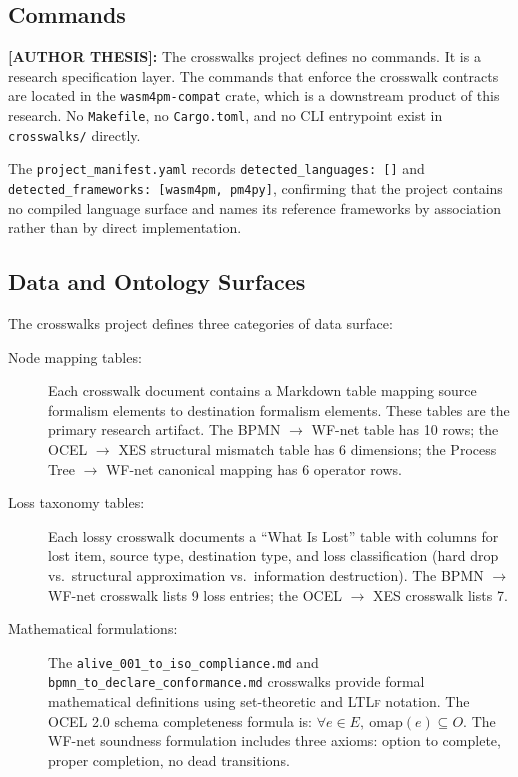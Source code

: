 \subsection{Commands}
\label{sec:crosswalks-impl-commands}

\textbf{[AUTHOR THESIS]:} The crosswalks project defines no commands. It is a research
specification layer. The commands that enforce the crosswalk contracts are located in the
\texttt{wasm4pm-compat} crate, which is a downstream product of this research. No \texttt{Makefile},
no \texttt{Cargo.toml}, and no CLI entrypoint exist in \texttt{crosswalks/} directly.

The \texttt{project\_manifest.yaml} records \texttt{detected\_languages: []} and
\texttt{detected\_frameworks: [wasm4pm, pm4py]}, confirming that the project contains no
compiled language surface and names its reference frameworks by association rather than
by direct implementation.

\subsection{Data and Ontology Surfaces}
\label{sec:crosswalks-impl-data}

The crosswalks project defines three categories of data surface:

\begin{description}
  \item[Node mapping tables:] Each crosswalk document contains a Markdown table mapping source
    formalism elements to destination formalism elements. These tables are the primary research
    artifact. The \textsc{BPMN} $\to$ WF-net table has 10 rows; the \textsc{OCEL} $\to$ \textsc{XES}
    structural mismatch table has 6 dimensions; the Process Tree $\to$ WF-net canonical mapping
    has 6 operator rows.
  \item[Loss taxonomy tables:] Each lossy crosswalk documents a ``What Is Lost'' table with
    columns for lost item, source type, destination type, and loss classification (hard drop
    vs.\ structural approximation vs.\ information destruction). The \textsc{BPMN} $\to$ WF-net
    crosswalk lists 9 loss entries; the \textsc{OCEL} $\to$ \textsc{XES} crosswalk lists 7.
  \item[Mathematical formulations:] The \texttt{alive\_001\_to\_iso\_compliance.md} and
    \texttt{bpmn\_to\_declare\_conformance.md} crosswalks provide formal mathematical
    definitions using set-theoretic and \textsc{LTLf} notation. The \textsc{OCEL} 2.0 schema
    completeness formula is: $\forall e \in E,\ \text{omap}(e) \subseteq O$. The WF-net
    soundness formulation includes three axioms: option to complete, proper completion, no dead
    transitions.
\end{description}

